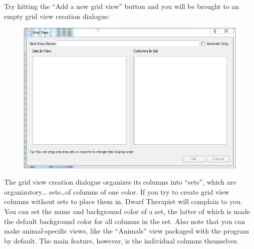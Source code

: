 \documentclass[]{article}
\begin{document}
Try hitting the ``Add a new grid view'' button and you will be brought to an empty grid view creation
dialogue:
\vspace{24pt}

\begin{figure}[h!]
\centering
\includegraphics[width=\linewidth]{Sec3Fig13+}
\end{figure}

The grid view creation dialogue organizes its columns into ``sets'', which are organizatory\ldots
sets\ldots of columns of one color. If you try to create grid view columns without sets to place them in,
Dwarf Therapist will complain to you. You can set the name and background color of a set, the latter of
which is made the default background color for all columns in the set. Also note that you can make
animal-specific views, like the ``Animals'' view packaged with the program by default. The main feature,
however, is the individual columns themselves.
\end{document}
